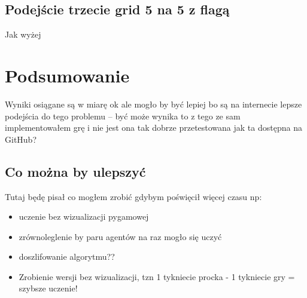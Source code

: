 \documentclass[a4paper, 12pt,oneside]{book}
\begin{document}

\section{Podejście trzecie grid 5 na 5 z flagą}
Jak wyżej

\chapter{Podsumowanie}
Wyniki osiągane są w miarę ok ale mogło by być lepiej bo są na internecie lepsze
podejścia do tego problemu -- być może wynika to z tego ze sam implementowałem grę
i nie jest ona tak dobrze przetestowana jak ta dostępna na GitHub?
\section{Co można by ulepszyć}
Tutaj będę pisał co mogłem zrobić gdybym poświęcił więcej czasu np:
\begin{itemize}
\item uczenie bez wizualizacji pygamowej
\item zrównoleglenie by paru agentów na raz mogło się uczyć
\item doszlifowanie algorytmu??
\item Zrobienie wersji bez wizualizacji, tzn 1 tykniecie procka - 1 tykniecie
	gry =  szybsze uczenie!
\end{itemize}




\end{document}

